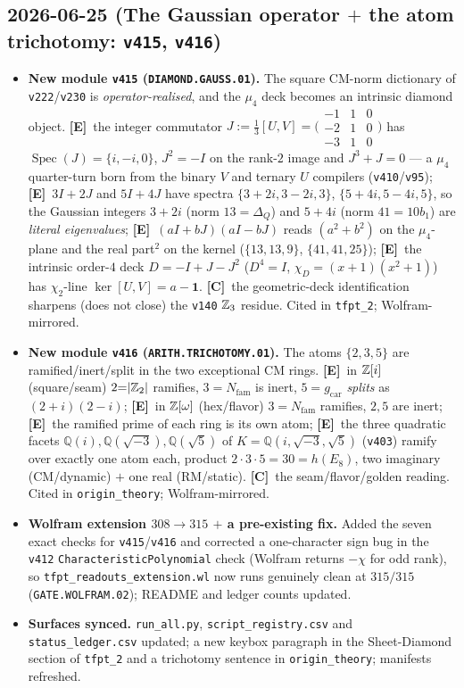 \documentclass[11pt]{article}
\providecommand{\mE}{\textbf{[E]}}\providecommand{\mC}{\textbf{[C]}}
\providecommand{\vref}[1]{\texttt{#1}}
\providecommand{\gcar}{g_{\mathrm{car}}}\providecommand{\Nfam}{N_{\mathrm{fam}}}
\begin{document}
\subsection*{2026-06-25 (The Gaussian operator $+$ the atom trichotomy: \texttt{v415}, \texttt{v416})}
\begin{itemize}
\item \textbf{New module \texttt{v415} (\texttt{DIAMOND.GAUSS.01}).} The square CM-norm dictionary of
\vref{v222}/\vref{v230} is \emph{operator-realised}, and the $\mu_4$ deck becomes an intrinsic diamond
object. \mE\ the integer commutator $J:=\tfrac13[U,V]=\big(\begin{smallmatrix}-1&1&0\\-2&1&0\\-3&1&0\end{smallmatrix}\big)$
has $\operatorname{Spec}(J)=\{i,-i,0\}$, $J^2=-I$ on the rank-$2$ image and $J^3+J=0$ --- a $\mu_4$
quarter-turn born from the binary $V$ and ternary $U$ compilers (\vref{v410}/\vref{v95}); \mE\ $3I+2J$ and
$5I+4J$ have spectra $\{3{+}2i,3{-}2i,3\}$, $\{5{+}4i,5{-}4i,5\}$, so the Gaussian integers $3{+}2i$ (norm
$13{=}\Delta_Q$) and $5{+}4i$ (norm $41{=}10b_1$) are \emph{literal eigenvalues}; \mE\ $(aI{+}bJ)(aI{-}bJ)$
reads $(a^2{+}b^2)$ on the $\mu_4$-plane and the real part$^2$ on the kernel ($\{13,13,9\}$, $\{41,41,25\}$);
\mE\ the intrinsic order-$4$ deck $D=-I+J-J^2$ ($D^4=I$, $\chi_D=(x{+}1)(x^2{+}1)$) has $\chi_2$-line
$\ker[U,V]=a-\mathbf 1$. \mC\ the geometric-deck identification sharpens (does not close) the \vref{v140}
$\mathbb{Z}_3$ residue. Cited in \texttt{tfpt\_2}; Wolfram-mirrored.
\item \textbf{New module \texttt{v416} (\texttt{ARITH.TRICHOTOMY.01}).} The atoms $\{2,3,5\}$ are
ramified/inert/split in the two exceptional CM rings. \mE\ in $\mathbb{Z}[i]$ (square/seam) $2{=}|\mathbb{Z}_2|$ ramifies,
$3{=}\Nfam$ is inert, $5{=}\gcar$ \emph{splits} as $(2{+}i)(2{-}i)$; \mE\ in $\mathbb{Z}[\omega]$ (hex/flavor)
$3{=}\Nfam$ ramifies, $2,5$ are inert; \mE\ the ramified prime of each ring is its own atom; \mE\ the three
quadratic facets $\mathbb Q(i),\mathbb Q(\sqrt{-3}),\mathbb Q(\sqrt5)$ of $K=\mathbb Q(i,\sqrt{-3},\sqrt5)$
(\vref{v403}) ramify over exactly one atom each, product $2\cdot3\cdot5=30=h(E_8)$, two imaginary
(CM/dynamic) $+$ one real (RM/static). \mC\ the seam/flavor/golden reading. Cited in
\texttt{origin\_theory}; Wolfram-mirrored.
\item \textbf{Wolfram extension $308\to315$ $+$ a pre-existing fix.} Added the seven exact checks for
\texttt{v415}/\texttt{v416} and corrected a one-character sign bug in the \texttt{v412}
\texttt{CharacteristicPolynomial} check (Wolfram returns $-\chi$ for odd rank), so
\texttt{tfpt\_readouts\_extension.wl} now runs genuinely clean at $315/315$ (\texttt{GATE.WOLFRAM.02});
README and ledger counts updated.
\item \textbf{Surfaces synced.} \texttt{run\_all.py}, \texttt{script\_registry.csv} and
\texttt{status\_ledger.csv} updated; a new keybox paragraph in the Sheet-Diamond section of \texttt{tfpt\_2}
and a trichotomy sentence in \texttt{origin\_theory}; manifests refreshed.
\end{itemize}
\end{document}
